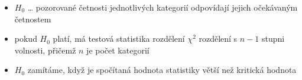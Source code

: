 \begin{itemize}
\begin{itemize}
\begin{itemize}
\item použijeme $\chi^2$ distribuci pro 5 stupňů volnosti
\begin{itemize}
\item pokud $\chi^2$ pro naši konkrétní kostku náleží kritickému oboru $W$, prohlásíme, že kostka není spravedlivá
\end{itemize}
\end{itemize}
\item $H_0$ \dots{} pozorované četnosti jednotlivých kategorií odpovídají jejich očekávaným četnostem
\item pokud $H_0$ platí, má testová statistika rozdělení $\chi^2$ rozdělení s $n-1$ stupni volnosti, přičemž $n$ je počet kategorií
\item $H_0$ zamítáme, když je spočítaná hodnota statistiky větší než kritická hodnota
\end{itemize}
\end{itemize}
